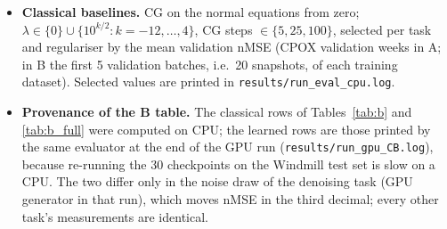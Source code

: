 \documentclass{article}
\begin{document}
\begin{itemize}
complete), MontevideoBus (743 snapshots, 675 nodes, 690 edges) as training sets with a 10\,\% chronological
validation tail each; WikiMaths (1068 nodes; 20\,\% of snapshots) and Windmill (319 nodes, complete; 5\,\%
of 17k snapshots) test-only. Held-out dataset = whole series. Batches never mix datasets.
\item \textbf{Classical baselines.} CG on the normal equations from zero;
$\lambda \in \{0\} \cup \{10^{k/2}: k = -12, \dots, 4\}$, CG steps $\in \{5, 25, 100\}$, selected per task and
regulariser by the mean validation nMSE (CPOX validation weeks in A; in B the first 5 validation batches, i.e.\
20 snapshots, of each training dataset). Selected values are printed in \texttt{results/run\_eval\_cpu.log}.
\item \textbf{Provenance of the B table.} The classical rows of Tables~\ref{tab:b} and \ref{tab:b_full} were
computed on CPU; the learned rows are those printed by the same evaluator at the end of the GPU run
(\texttt{results/run\_gpu\_CB.log}), because re-running the 30 checkpoints on the Windmill test set is slow on
a CPU. The two differ only in the noise draw of the denoising task (GPU generator in that run), which moves
nMSE in the third decimal; every other task's measurements are identical.
\end{itemize}
\end{document}
